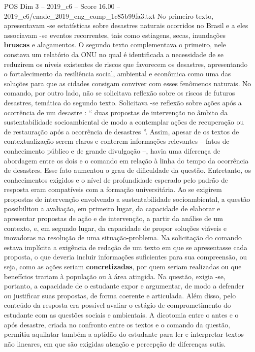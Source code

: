 \begin{textsample}{POS Dim 3 – 2019\_c6 – Score 16.00 – 2019\_c6/enade\_2019\_eng\_comp\_1c85b99fa3.txt}
No primeiro texto, apresentavam -se estatísticas sobre desastres naturais ocorridos no Brasil e a eles associavam -se eventos recorrentes, tais como estiagens, secas, inundações \textbf{bruscas} e alagamentos.
O segundo texto complementava o primeiro, nele constava um relatório da ONU no qual é identificada a necessidade de se reduzirem os níveis existentes de riscos que favorecem os desastres, apresentando o fortalecimento da resiliência social, ambiental e econômica como uma das soluções para que as cidades consigam conviver com esses fenômenos naturais.
No comando, por outro lado, não se solicitava reflexão sobre os riscos de futuros desastres, temática do segundo texto.
Solicitava -se reflexão sobre ações após a ocorrência de um desastre : “ duas propostas de intervenção no âmbito da sustentabilidade socioambiental de modo a contemplar ações de recuperação ou de restauração após a ocorrência de desastres ”.
Assim, apesar de os textos de contextualização serem claros e conterem informações relevantes – fatos de conhecimento público e de grande divulgação –, havia uma diferença de abordagem entre os dois e o comando em relação à linha do tempo da ocorrência de desastres.
Esse fato aumentou o grau de dificuldade da questão.
Entretanto, os conhecimentos exigidos e o nível de profundidade esperado pelo padrão de resposta eram compatíveis com a formação universitária.
Ao se exigirem propostas de intervenção envolvendo a sustentabilidade socioambiental, a questão possibilitou a avaliação, em primeiro lugar, da capacidade de elaborar e apresentar propostas de ação e de intervenção, a partir da análise de um contexto, e, em segundo lugar, da capacidade de propor soluções viáveis e inovadoras na resolução de uma situação-problema.
Na solicitação do comando estava implícita a exigência de redação de um texto em que se apresentasse cada proposta, o que deveria incluir informações suficientes para sua compreensão, ou seja, como as ações seriam \textbf{concretizadas}, por quem seriam realizadas ou que benefícios trariam à população ou à área atingida.
Na questão, exigia -se, portanto, a capacidade de o estudante expor e argumentar, de modo a defender ou justificar suas propostas, de forma coerente e articulada.
Além disso, pelo conteúdo da resposta era possível avaliar o estágio de comprometimento do estudante com as questões sociais e ambientais.
A dicotomia entre o antes e o após desastre, criada no confronto entre os textos e o comando da questão, permitiu aquilatar também a aptidão do estudante para ler e interpretar textos não lineares, em que são exigidas atenção e percepção de diferenças sutis.

\end{textsample}
